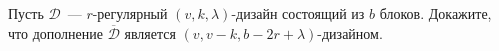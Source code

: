 Пусть $\mathcal{D}$~--- $r$-регулярный $(v, k, \lambda)$-дизайн состоящий из $b$ блоков. Докажите, что
дополнение $\overline{\mathcal{D}}$ является $(v, v - k, b - 2r + \lambda)$-дизайном.
